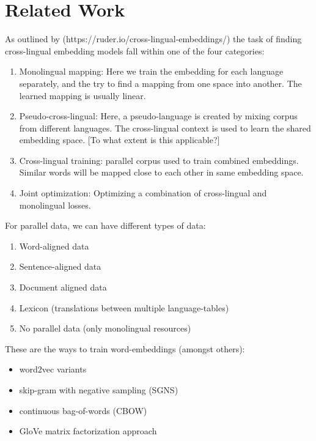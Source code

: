 \documentclass[a4paper,12pt,twoside,openright]{report}
\begin{document}
\chapter{Related Work}

As outlined by (https://ruder.io/cross-lingual-embeddings/) the task of finding cross-lingual embedding models fall within one of the four categories:

\begin{enumerate}
\item Monolingual mapping: Here we train the embedding for each language separately, and the try to find a mapping from one space into another.
The learned mapping is usually linear.
\item Pseudo-cross-lingual: Here, a pseudo-language is created by mixing corpus from different languages.
The cross-lingual context is used to learn the shared embedding space.
[To what extent is this applicable?]
\item Cross-lingual training: parallel corpus used to train combined embeddings. Similar words will be mapped close to each other in same embedding space.
\item Joint optimization: Optimizing a combination of cross-lingual and monolingual losses.
\end{enumerate}

For parallel data, we can have different types of data:

\begin{enumerate}
\item Word-aligned data
\item Sentence-aligned data
\item Document aligned data
\item Lexicon (translations between multiple language-tables)
\item No parallel data (only monolingual resources)
\end{enumerate}

These are the ways to train word-embeddings (amongst others):

\begin{itemize}
\item word2vec variants
\item skip-gram with negative sampling (SGNS)
\item continuous bag-of-words (CBOW)
\item GloVe matrix factorization approach
\end{itemize}
\end{document}
